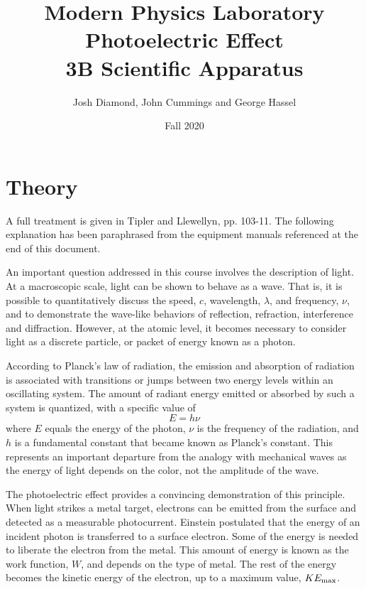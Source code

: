 \documentclass{article}
\begin{document}
\title{Modern Physics Laboratory\\
	Photoelectric Effect\\
	3B Scientific Apparatus}
\author{Josh Diamond, John Cummings and George Hassel}
\date{Fall 2020}
\maketitle



\section{Theory}


A full treatment is given in Tipler and Llewellyn, pp. 103-11.  The following explanation has been paraphrased from the equipment manuals referenced at the end of this document.

An important question addressed in this course involves the description of light.   At a macroscopic scale, light can be shown to behave as a wave.  That is, it is possible to quantitatively discuss the speed, $c$, wavelength, $\lambda$, and frequency, $\nu$, and to demonstrate the wave-like behaviors of reflection, refraction, interference and diffraction.  However, at the atomic level, it becomes necessary to consider light as a discrete particle, or packet of energy known as a photon.    

According to Planck's law of radiation, the emission and absorption of radiation is associated with transitions or jumps between two energy levels within an oscillating system.   The amount of radiant energy emitted or absorbed by such a system is quantized, with a specific value of 
\begin{equation} 
E = h \nu
\end{equation}
where $E$ equals the energy of the photon, $\nu$ is the frequency of the radiation, and $h$ is a fundamental constant that became known as Planck's constant.  This represents an important departure from the analogy with mechanical waves as the energy of light depends on the color, not the amplitude of the wave.   

The photoelectric effect provides a convincing demonstration of this principle.   When light strikes a metal target, electrons can be emitted from the surface and detected as a measurable photocurrent.    Einstein postulated that the energy of an incident photon is transferred to a surface electron.  Some of the energy is needed to liberate the electron from the metal.   This amount of energy is known as the work function, $W$, and depends on the type of metal.   The rest of the energy becomes the kinetic energy of the electron, up to a maximum value, $KE_{\rm max}$.    
\end{document}
